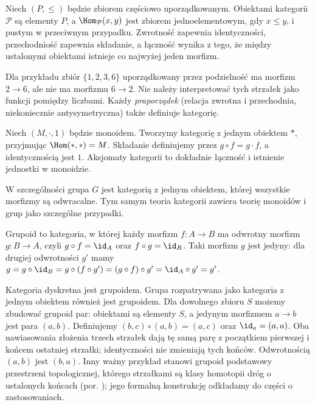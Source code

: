 \begin{przyklad}\label{przyklad:poset}
Niech $(P,\leq)$ będzie zbiorem częściowo uporządkowanym. Obiektami kategorii $\mathcal P$ są elementy $P$, a $\Hom_{\mathcal P}(x,y)$ jest zbiorem jednoelementowym, gdy $x\leq y$, i pustym w przeciwnym przypadku. Zwrotność zapewnia identyczności, przechodniość zapewnia składanie, a łączność wynika z tego, że między ustalonymi obiektami istnieje co najwyżej jeden morfizm.

Dla przykładu zbiór $\{1,2,3,6\}$ uporządkowany przez podzielność ma morfizm $2\to 6$, ale nie ma morfizmu $6\to 2$. Nie należy interpretować tych strzałek jako funkcji pomiędzy liczbami. Każdy \emph{praporządek} (relacja zwrotna i przechodnia, niekoniecznie antysymetryczna) także definiuje kategorię.
\end{przyklad}

\begin{przyklad}\label{przyklad:monoid-kat}
Niech $(M,\cdot,1)$ będzie monoidem. Tworzymy kategorię z jednym obiektem $*$, przyjmując $\Hom(*,*)=M$. Składanie definiujemy przez $g\circ f=g\cdot f$, a identycznością jest $1$. Aksjomaty kategorii to dokładnie łączność i istnienie jednostki w monoidzie.

W szczególności grupa $G$ jest kategorią z jednym obiektem, której wszystkie morfizmy są odwracalne. Tym samym teoria kategorii zawiera teorię monoidów i grup jako szczególne przypadki.
\end{przyklad}

\begin{definicja}[Grupoid]\label{cat:def:grupoid}
Grupoid to kategoria, w której każdy morfizm $f:A\to B$ ma odwrotny morfizm $g:B\to A$, czyli $g\circ f=\id_A$ oraz $f\circ g=\id_B$. Taki morfizm $g$ jest jedyny: dla drugiej odwrotności $g'$ mamy $g=g\circ\id_B=g\circ(f\circ g')=(g\circ f)\circ g'=\id_A\circ g'=g'$.
\end{definicja}

\begin{przyklad}[Grupoidy]\label{cat:ex:grupoid}
Kategoria dyskretna jest grupoidem. Grupa rozpatrywana jako kategoria z jednym obiektem również jest grupoidem. Dla dowolnego zbioru $S$ możemy zbudować grupoid par: obiektami są elementy $S$, a jedynym morfizmem $a\to b$ jest para $(a,b)$. Definiujemy $(b,c)\circ(a,b)=(a,c)$ oraz $\id_a=(a,a)$. Oba nawiasowania złożenia trzech strzałek dają tę samą parę z początkiem pierwszej i końcem ostatniej strzałki; identyczności nie zmieniają tych końców. Odwrotnością $(a,b)$ jest $(b,a)$. Inny ważny przykład stanowi grupoid podstawowy przestrzeni topologicznej, którego strzałkami są klasy homotopii dróg o ustalonych końcach (por. ); jego formalną konstrukcję odkładamy do części o zastosowaniach.
\end{przyklad}

